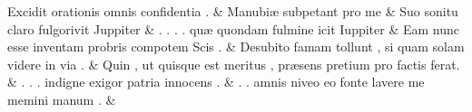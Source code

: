 \documentclass[12pt,onecolumn,twoside,a4paper]{memoir}
\begin{document}
\begin{pairs}
\begin{Leftside}
                              Excidit
                              orationis
                              omnis
                              confidentia
                              . \&
                         \stanza 
                     Manubiæ
                              subpetant
                              pro
                              me \&
                         \stanza 
                     Suo
                              sonitu
                              claro
                              fulgorivit
                              Juppiter \&
                         \stanza 
                     .
                              .
                              .
                              .
                              quæ
                              quondam
                              fulmine
                              icit
                              Iuppiter \&
                         \stanza 
                     Eam
                              nunc
                              esse
                              inventam
                              probris
                              compotem
                              Scis
                              . \&
                         \stanza 
                     Desubito
                              famam
                              tollunt
                              ,
                              si
                              quam
                              solam
                              videre
                              in
                              via
                              . \&
                         \stanza 
                     Quin
                              ,
                              ut
                              quisque
                              est
                              meritus
                              ,
                              præsens
                              pretium
                              pro
                              factis
                              ferat. \&
                         \stanza 
                     .
                              .
                              .
                              indigne
                              exigor
                              patria
                              innocens
                              . \&
                         \stanza 
                     .
                              .
                              amnis
                              niveo
                              eo
                              fonte
                              lavere
                              me
                              memini
                              manum
                              . \&
                     

\end{Leftside}
\end{pairs}
\end{document}
